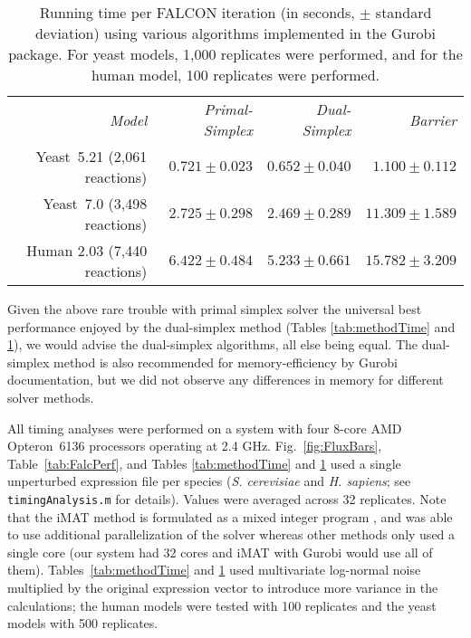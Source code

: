 \begin{table}
\begin{center}
\begin{tabular}{rrrr}
\emph{Model}                 & \emph{Primal-Simplex} & \emph{Dual-Simplex} & \emph{Barrier} \\
Yeast~5.21 (2,061 reactions) & $ 0.721 \pm 0.023 $ & $ 0.652 \pm 0.040 $ & $ 1.100 \pm 0.112  $\\ 
Yeast~7.0 (3,498 reactions)  & $ 2.725 \pm 0.298 $ & $ 2.469 \pm 0.289 $ & $ 11.309 \pm 1.589 $\\
Human 2.03 (7,440 reactions) & $ 6.422 \pm 0.484 $ & $ 5.233 \pm 0.661 $ & $ 15.782 \pm 3.209 $\\ 
\end{tabular}
\end{center}
\caption{Running time per FALCON iteration (in seconds, $\pm$ standard
  deviation) using various algorithms implemented in the Gurobi
  package.  For yeast models, 1,000 replicates were performed, and for
  the human model, 100 replicates were performed.}
\label{tab:methodTimeIter}
\end{table}

Given the above rare trouble with primal simplex solver the universal
best performance enjoyed by the dual-simplex method (\suppOrApp Tables
\ref{tab:methodTime} and \ref{tab:methodTimeIter}), we would advise
the dual-simplex algorithms, all else being equal. The dual-simplex
method is also recommended for memory-efficiency by Gurobi
documentation, but we did not observe any differences in memory for
different solver methods.

All timing analyses were performed on a system with four 8-core AMD
Opteron\texttrademark\ 6136 processors operating at 2.4
GHz. Fig.~\ref{fig:FluxBars}, Table~\ref{tab:FalcPerf}, and \suppOrApp
Tables \ref{tab:methodTime} and \ref{tab:methodTimeIter} used a single
unperturbed expression file per species (\textit{S. cerevisiae} and
\textit{H. sapiens}; see \texttt{timingAnalysis.m} for
details). Values were averaged across 32 replicates. \suppOrApp
Note that the iMAT method is formulated as a mixed integer program
\citep{Shlomi2008}, and was able to use additional parallelization of
the solver \citep{gurobi} whereas other methods only used a single
core (our system had 32 cores and iMAT with Gurobi would use all of
them). Tables~\ref{tab:methodTime} and \ref{tab:methodTimeIter} used
multivariate log-normal noise multiplied by the original expression
vector to introduce more variance in the calculations; the human
models were tested with 100 replicates and the yeast models with 500
replicates.

